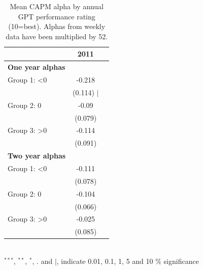 
\begin{table}[ht]
\centering
\caption{Mean CAPM alpha by annual GPT performance rating (10=best). Alphas from weekly data  have been multiplied by 52. 
}
\label{table:resultsM}
\begin{tabular}{lcc}
\toprule
& \textbf {2011} \\
\midrule\addlinespace[0.4mm]
\textbf{One year alphas} & & \\
\quad Group 1: \textless 0 & -0.218 \\
 & (0.114) $|$ \\
\quad Group 2: 0 & -0.09 \\
 & (0.079) \\
\quad Group 3: \textgreater 0 & -0.114 \\
 & (0.091) \\
\textbf{Two year alphas} & & \\
\quad Group 1: \textless 0 & -0.111 \\
 & (0.078) \\
\quad Group 2: 0 & -0.104 \\
 & (0.066) \\
\quad Group 3: \textgreater 0 & -0.025 \\
 & (0.085) \\
 
\bottomrule
\end{tabular}
\footnotesize \\
$^{***}$, $^{**}$, $^{*}$, . and $|$, indicate 0.01, 0.1, 1, 5 and 10 \% significance
\end{table}
